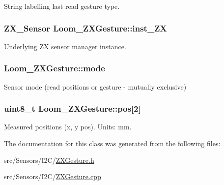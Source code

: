 String labelling last read gesture type. 

\subsubsection[{\texorpdfstring{inst\+\_\+\+ZX}{inst_ZX}}]{\setlength{\rightskip}{0pt plus 5cm}Z\+X\+\_\+\+Sensor Loom\+\_\+\+Z\+X\+Gesture\+::inst\+\_\+\+ZX\hspace{0.3cm}{\ttfamily [protected]}}\hypertarget{class_loom___z_x_gesture_a7b338ec49ed044f2b8faf13384dd19a1}{}\label{class_loom___z_x_gesture_a7b338ec49ed044f2b8faf13384dd19a1}


Underlying ZX sensor manager instance. 

\subsubsection[{\texorpdfstring{mode}{mode}}]{ Loom\+\_\+\+Z\+X\+Gesture\+::mode\hspace{0.3cm}{\ttfamily [protected]}}\hypertarget{class_loom___z_x_gesture_a06039a2e005fee4e1542534cc71b1316}{}\label{class_loom___z_x_gesture_a06039a2e005fee4e1542534cc71b1316}


Sensor mode (read positions or gesture -\/ mutually exclusive) 

\subsubsection[{\texorpdfstring{pos}{pos}}]{\setlength{\rightskip}{0pt plus 5cm}uint8\+\_\+t Loom\+\_\+\+Z\+X\+Gesture\+::pos\mbox{[}2\mbox{]}\hspace{0.3cm}{\ttfamily [protected]}}\hypertarget{class_loom___z_x_gesture_aceb243194a3f03ca569ddbb4b41ef56c}{}\label{class_loom___z_x_gesture_aceb243194a3f03ca569ddbb4b41ef56c}


Measured positions (x, y pos). Units\+: mm. 



The documentation for this class was generated from the following files\+:\begin{DoxyCompactItemize}
\item 
src/\+Sensors/\+I2\+C/\hyperlink{_z_x_gesture_8h}{Z\+X\+Gesture.\+h}\item 
src/\+Sensors/\+I2\+C/\hyperlink{_z_x_gesture_8cpp}{Z\+X\+Gesture.\+cpp}\end{DoxyCompactItemize}
